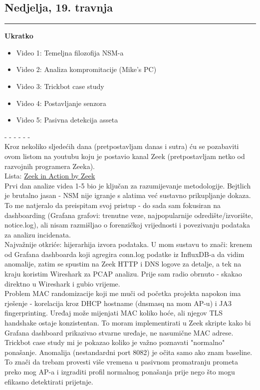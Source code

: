 \documentclass[12pt, a4paper]{article}
\newcommand{\dan}[1]{
    \subsection*{#1}
    \vspace{-0.5em} 
    \hrule \vspace{0.5em} 
}
\begin{document}
\dan{Nedjelja, 19. travnja}
\textbf{Ukratko}
\begin{itemize}
    \item Video 1: Temeljna filozofija NSM-a
    \item Video 2: Analiza kompromitacije (Mike's PC)
    \item Video 3: Trickbot case study
    \item Video 4: Postavljanje senzora
    \item Video 5: Pasivna detekcija asseta
\end{itemize}
- - - - - - \\
Kroz nekoliko sljedećih dana (pretpostavljam danas i sutra) ću se pozabaviti ovom listom na youtubu koju je postavio kanal Zeek 
(pretpostavljam netko od razvojnih programera Zeeka).
\\
Lista: \href{https://www.youtube.com/playlist?list=PL2EYTX8UVCMitvFQeWxILfR0cTAhaWz9w}{Zeek in Action by Zeek}
\\
Prvi dan analize videa 1-5 bio je ključan za razumijevanje metodologije. Bejtlich je brutalno jasan - NSM nije igranje s 
alatima već sustavno prikupljanje dokaza. To me natjeralo da preispitam svoj pristup - do sada sam fokusiran na dashboarding 
(Grafana grafovi: trenutne veze, najpopularnije odredište/izvorište, notice.log), ali nisam razmišljao o forenzičkoj vrijednosti i 
povezivanju podataka za analizu incidenata.
\\
Najvažnije otkriće: hijerarhija izvora podataka. U mom sustavu to znači: krenem od Grafana dashboarda koji agregira conn.log podatke 
iz InfluxDB-a da vidim anomalije, zatim se spustim na Zeek HTTP i DNS logove za detalje, a tek na kraju koristim Wireshark za PCAP 
analizu. Prije sam radio obrnuto - skakao direktno u Wireshark i gubio vrijeme.
\\
Problem MAC randomizacije koji me muči od početka projekta napokon ima rješenje - korelacija kroz DHCP hostname 
(dnsmasq na mom AP-u) i JA3 fingerprinting. Uređaj može mijenjati MAC koliko hoće, ali njegov TLS handshake ostaje konzistentan. 
To moram implementirati u Zeek skripte kako bi Grafana dashboard prikazivao stvarne uređaje, ne nasumične MAC adrese.
\\
Trickbot case study mi je pokazao koliko je važno poznavati "normalno" ponašanje. Anomalija (nestandardni port 8082) je očita samo 
ako znam baseline. To znači da trebam provesti više vremena u pasivnom promatranju prometa preko mog AP-a i izgraditi profil normalnog
 ponašanja prije nego što mogu efikasno detektirati prijetnje. 
\end{document}
